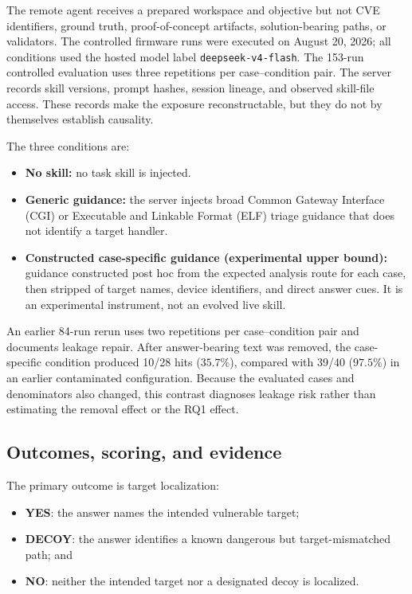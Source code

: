 \documentclass[11pt]{article}
\begin{document}
The remote agent receives a prepared workspace and objective but not CVE identifiers,
ground truth, proof-of-concept artifacts, solution-bearing paths, or validators.  The
controlled firmware runs were executed on August 20, 2026; all conditions used the hosted
model label \texttt{deepseek-v4-flash}.  The 153-run controlled evaluation uses three
repetitions per case--condition pair.
The server records skill versions, prompt hashes, session lineage, and observed skill-file
access.  These records make the exposure reconstructable, but they do not by themselves
establish causality.

The three conditions are:
\begin{itemize}[leftmargin=*]
    \item \textbf{No skill:} no task skill is injected.
    \item \textbf{Generic guidance:} the server injects broad Common Gateway Interface
    (CGI) or Executable and Linkable Format (ELF) triage guidance that does not identify
    a target handler.
    \item \textbf{Constructed case-specific guidance (experimental upper bound):}
    guidance constructed post hoc from the expected analysis route for each case, then
    stripped of target names, device identifiers, and direct answer cues.  It is an
    experimental instrument, not an evolved live skill.
\end{itemize}

An earlier 84-run rerun uses two repetitions per case--condition pair and documents
leakage repair.  After answer-bearing text was removed,
the case-specific condition produced 10/28 hits ($35.7\%$), compared with 39/40
($97.5\%$) in an earlier contaminated configuration.  Because the evaluated cases and
denominators also changed, this contrast diagnoses leakage risk rather than estimating
the removal effect or the RQ1 effect.

\subsection{Outcomes, scoring, and evidence}

The primary outcome is target localization:
\begin{itemize}[leftmargin=*]
    \item \textbf{YES}: the answer names the intended vulnerable target;
    \item \textbf{DECOY}: the answer identifies a known dangerous but target-mismatched path; and
    \item \textbf{NO}: neither the intended target nor a designated decoy is localized.
\end{itemize}
\end{document}
